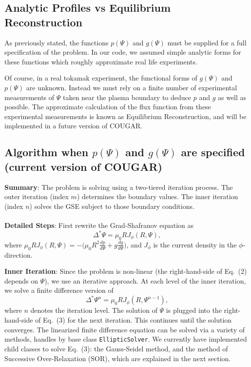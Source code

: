\documentclass[paper=letter, fontsize=11pt]{scrartcl} %
\begin{document}
\subsection{Analytic Profiles vs Equilibrium Reconstruction}
As previously stated, the functions $p(\Psi)$ and $g(\Psi)$ must be supplied for a full specification of the problem.  In our code, we assumed simple analytic forms for these functions which roughly approximate real life experiments.  

Of course, in a real tokamak experiment, the functional forms of $g(\Psi)$ and $p(\Psi)$ are unknown.  Instead we must rely on a finite number of experimental measurements of $\Psi$ taken near the plasma boundary to deduce $p$ and $g$ as well as possible.  The approximate calculation of the flux function from these experimental measurements is known as Equilibrium Reconstruction, and will be implemented in a future version of COUGAR.  

\subsection{Algorithm when $p(\Psi)$ and $g(\Psi)$ are specified (current version of COUGAR)}

\textbf{Summary}: The problem is solving using a two-tiered iteration process.  The outer iteration (index $m$) determines the boundary values.  The inner iteration (index $n$) solves the GSE subject to those boundary conditions.
\\ \\
\textbf{Detailed Steps}: First rewrite the Grad-Shafranov equation as
\begin{equation}
\Delta^{*}\Psi = \mu_0 R J_{\phi} (R, \Psi),
\end{equation}
where $\mu_0 R J_{\phi} (R,\Psi) = - \big(\mu_0 R^2 \frac{d p}{d\Psi} + g \frac{d g}{d\Psi}\big)$, and $J_{\phi}$ is the current density in the $\phi$-direction.

\textbf{Inner Iteration}: Since the problem is non-linear (the right-hand-side of Eq.~(2) depends on $\Psi$), we use an iterative approach.  At each level of the inner iteration, we solve a finite difference version of 
\begin{equation}
\Delta^{*}\Psi^{n} = \mu_0 R J_\phi (R, \Psi^{n-1}),
\end{equation}
where $n$ denotes the iteration level. The solution of $\Psi$ is plugged into the right-hand-side of Eq.~(3) for the next iteration.  This continues until the solution converges.  The linearized finite difference equation can be solved via a variety of methods, handles by base class \texttt{EllipticSolver}.  We currently have implemented child classes to solve Eq.~(3): the Gauss-Seidel method, and the method of Successive Over-Relaxation (SOR), which are explained in the next section.  
\end{document}
